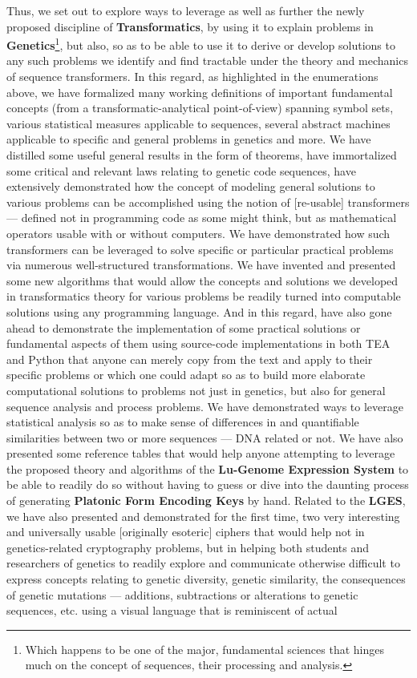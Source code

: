 \documentclass[a4paper, 18pt]{book} %
\begin{document}
\vspace{1em}

Thus, we set out to explore ways to leverage as well as further the newly proposed discipline of \textbf{Transformatics}, by using it to explain problems in \textbf{Genetics}\footnote{Which happens to be one of the major, fundamental sciences that hinges much on the concept of sequences, their processing and analysis.}, but also, so as to be able to use it to derive or develop solutions to any such problems we identify and find tractable under the theory and mechanics of sequence transformers. In this regard, as highlighted in the enumerations above, we have formalized many working definitions of important fundamental concepts (from a transformatic-analytical point-of-view) spanning symbol sets, various statistical measures applicable to sequences, several abstract machines applicable to specific and general problems in genetics and more. We have distilled some useful general results in the form of theorems, have immortalized some critical and relevant laws relating to genetic code sequences, have extensively demonstrated how the concept of modeling general solutions to various problems can be accomplished using the notion of [re-usable] transformers --- defined not in programming code as some might think, but as mathematical operators usable with or without computers. We have demonstrated how such transformers can be leveraged to solve specific or particular practical problems via numerous well-structured transformations. We have invented and presented some new algorithms that would allow the concepts and solutions we developed in transformatics theory for various problems be readily turned into computable solutions using any programming language. And in this regard, have also gone ahead to demonstrate the implementation of some practical solutions or fundamental aspects of them using source-code implementations in both TEA and Python that anyone can merely copy from the text and apply to their specific problems or which one could adapt so as to build more elaborate computational solutions to problems not just in genetics, but also for general sequence analysis and process problems. We have demonstrated ways to leverage statistical analysis so as to make sense of differences in and quantifiable similarities between two or more sequences --- DNA related or not. We have also presented some reference tables that would help anyone attempting to leverage the proposed theory and algorithms of the \textbf{Lu-Genome Expression System} to be able to readily do so without having to guess or dive into the daunting process of generating \textbf{Platonic Form Encoding Keys} by hand. Related to the \textbf{LGES}, we have also presented and demonstrated for the first time, two very interesting and universally usable [originally esoteric] ciphers that would help not in genetics-related cryptography problems, but in helping both students and researchers of genetics to readily explore and communicate otherwise difficult to express concepts relating to genetic diversity, genetic similarity, the consequences of genetic mutations --- additions, subtractions or alterations to genetic sequences, etc. using a visual language that is reminiscent of actual 
\end{document}
